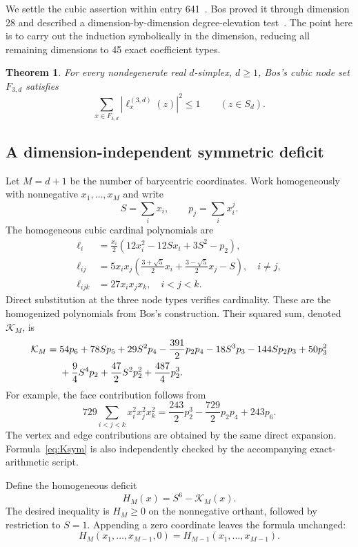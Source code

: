 \documentclass[11pt,a4paper]{article}
\newtheorem{theorem}{Theorem}[section]
\theoremstyle{remark}
\begin{document}
We settle the cubic assertion within entry 641~\cite{repo641}. Bos proved it through dimension 28 and described a dimension-by-dimension degree-elevation test~\cite{bos}. The point here is to carry out the induction symbolically in the dimension, reducing all remaining dimensions to 45 exact coefficient types.

\begin{theorem}\label{thm:cubic}
For every nondegenerate real $d$-simplex, $d\ge1$, Bos's cubic node set $F_{3,d}$ satisfies
\[
 \sum_{x\in F_{3,d}}|\ell_x^{(3,d)}(z)|^2\le1
 \qquad(z\in S_d).
\]
\end{theorem}

\subsection{A dimension-independent symmetric deficit}

Let $M=d+1$ be the number of barycentric coordinates. Work homogeneously with nonnegative $x_1,\ldots,x_M$ and write
\[
 S=\sum_i x_i,\qquad p_j=\sum_i x_i^j.
\]
The homogeneous cubic cardinal polynomials are
\begin{align}
 \ell_i&=\frac{x_i}{2}(12x_i^2-12Sx_i+3S^2-p_2),\label{eq:cubicvertex}\\
 \ell_{ij}&=5x_ix_j\left(\frac{3+\sqrt5}{2}x_i+
                 \frac{3-\sqrt5}{2}x_j-S\right),\quad i\ne j,
                 \label{eq:cubicedge}\\
 \ell_{ijk}&=27x_ix_jx_k,\quad i<j<k.\label{eq:cubicface}
\end{align}
Direct substitution at the three node types verifies cardinality. These are the homogenized polynomials from Bos's construction. Their squared sum, denoted $\mathcal K_M$, is
\begin{align}\label{eq:Ksym}
 \mathcal K_M={}&54p_6+78Sp_5+29S^2p_4-\frac{391}{2}p_2p_4
 -18S^3p_3-144Sp_2p_3+50p_3^2\notag\\
 &+\frac94S^4p_2+\frac{47}{2}S^2p_2^2+\frac{487}{4}p_2^3.
\end{align}
For example, the face contribution follows from
\[
 729\sum_{i<j<k}x_i^2x_j^2x_k^2
 =\frac{243}{2}p_2^3-\frac{729}{2}p_2p_4+243p_6.
\]
The vertex and edge contributions are obtained by the same direct expansion. Formula~\eqref{eq:Ksym} is also independently checked by the accompanying exact-arithmetic script.

Define the homogeneous deficit
\[
 H_M(x)=S^6-\mathcal K_M(x).
\]
The desired inequality is $H_M\ge0$ on the nonnegative orthant, followed by restriction to $S=1$. Appending a zero coordinate leaves the formula unchanged:
\[
 H_M(x_1,\ldots,x_{M-1},0)=H_{M-1}(x_1,\ldots,x_{M-1}).
\]
\end{document}
